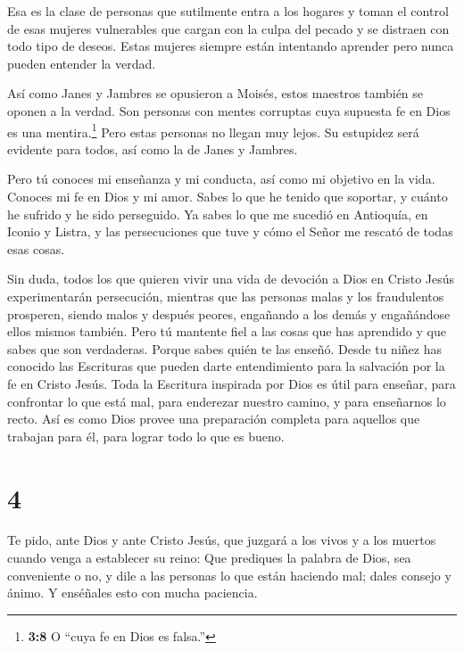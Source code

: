  Esa es la clase de personas que sutilmente entra a los
hogares y toman el control de esas mujeres vulnerables que cargan con la
culpa del pecado y se distraen con todo tipo de deseos. 
Estas mujeres siempre están intentando aprender pero nunca pueden
entender la verdad.

 Así como Janes y Jambres se opusieron a Moisés, estos
maestros también se oponen a la verdad. Son personas con mentes
corruptas cuya supuesta fe en Dios es una mentira.\footnote{\textbf{3:8}
  O ``cuya fe en Dios es falsa.''}  Pero estas personas no
llegan muy lejos. Su estupidez será evidente para todos, así como la de
Janes y Jambres.

 Pero tú conoces mi enseñanza y mi conducta, así como mi
objetivo en la vida. Conoces mi fe en Dios y mi amor. Sabes lo que he
tenido que soportar,  y cuánto he sufrido y he sido
perseguido. Ya sabes lo que me sucedió en Antioquía, en Iconio y Listra,
y las persecuciones que tuve y cómo el Señor me rescató de todas esas
cosas.

 Sin duda, todos los que quieren vivir una vida de devoción
a Dios en Cristo Jesús experimentarán persecución, 
mientras que las personas malas y los fraudulentos prosperen, siendo
malos y después peores, engañando a los demás y engañándose ellos mismos
también.  Pero tú mantente fiel a las cosas que has
aprendido y que sabes que son verdaderas. Porque sabes quién te las
enseñó.  Desde tu niñez has conocido las Escrituras que
pueden darte entendimiento para la salvación por la fe en Cristo Jesús.
 Toda la Escritura inspirada por Dios es útil para enseñar,
para confrontar lo que está mal, para enderezar nuestro camino, y para
enseñarnos lo recto.  Así es como Dios provee una
preparación completa para aquellos que trabajan para él, para lograr
todo lo que es bueno.

\hypertarget{section-3}{%
\section{4}\label{section-3}}

 Te pido, ante Dios y ante Cristo Jesús, que juzgará a los
vivos y a los muertos cuando venga a establecer su reino: 
Que prediques la palabra de Dios, sea conveniente o no, y dile a las
personas lo que están haciendo mal; dales consejo y ánimo. Y enséñales
esto con mucha paciencia.

